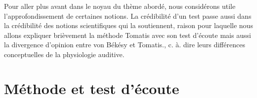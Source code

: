 

Pour aller plus avant dans le noyau du thème abordé, nous considérons utile
l'approfondissement de certaines notions. La crédibilité d'un test passe aussi dans la crédibilité des 
notions scientifiques qui la soutiennent, raison pour laquelle nous allons expliquer brièvement  la 
méthode Tomatis avec son test d'écoute mais aussi la
divergence d'opinion entre von Békésy et Tomatis., c. à. dire leurs différences conceptuelles de la 
physiologie auditive. 
\section{Méthode et test d'écoute}

